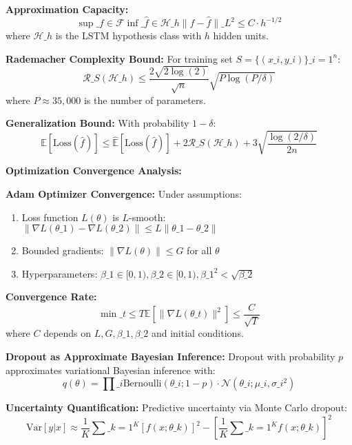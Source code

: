 \documentclass[11pt,a4paper]{article}
\begin{document}
\textbf{Approximation Capacity:}
\begin{equation}
\sup\_{f \in \mathcal{F}} \inf\_{\hat{f} \in \mathcal{H}\_h} \|f - \hat{f}\|\_{L^2} \leq C \cdot h^{-1/2}
\end{equation}
where $\mathcal{H}\_h$ is the LSTM hypothesis class with $h$ hidden units.

\textbf{Rademacher Complexity Bound:}
For training set $S = \{(x\_i, y\_i)\}\_{i=1}^n$:
\begin{equation}
\mathcal{R}\_S(\mathcal{H}\_h) \leq \frac{2\sqrt{2\log(2)}}{\sqrt{n}} \sqrt{P \log(P/\delta)}
\end{equation}
where $P \approx 35,000$ is the number of parameters.

\textbf{Generalization Bound:}
With probability $1-\delta$:
\begin{equation}
\mathbb{E}[\text{Loss}(\hat{f})] \leq \hat{\mathbb{E}}[\text{Loss}(\hat{f})] + 2\mathcal{R}\_S(\mathcal{H}\_h) + 3\sqrt{\frac{\log(2/\delta)}{2n}}
\end{equation}

\textbf{Optimization Convergence Analysis:}

\textbf{Adam Optimizer Convergence:}
Under assumptions:
\begin{enumerate}
\item Loss function $L(\theta)$ is $L$-smooth: $\|\nabla L(\theta\_1) - \nabla L(\theta\_2)\| \leq L\|\theta\_1 - \theta\_2\|$
\item Bounded gradients: $\|\nabla L(\theta)\| \leq G$ for all $\theta$
\item Hyperparameters: $\beta\_1 \in [0,1), \beta\_2 \in [0,1), \beta\_1^2 < \sqrt{\beta\_2}$

\end{enumerate}
\textbf{Convergence Rate:}
\begin{equation}
\min\_{t \leq T} \mathbb{E}[\|\nabla L(\theta\_t)\|^2] \leq \frac{C}{\sqrt{T}}
\end{equation}
where $C$ depends on $L, G, \beta\_1, \beta\_2$ and initial conditions.

\textbf{Dropout as Approximate Bayesian Inference:}
Dropout with probability $p$ approximates variational Bayesian inference with:
\begin{equation}
q(\theta) = \prod\_{i} \text{Bernoulli}(\theta\_i; 1-p) \cdot \mathcal{N}(\theta\_i; \mu\_i, \sigma\_i^2)
\end{equation}

\textbf{Uncertainty Quantification:}
Predictive uncertainty via Monte Carlo dropout:
\begin{equation}
\text{Var}[y|x] \approx \frac{1}{K} \sum\_{k=1}^K [f(x; \theta\_k)]^2 - \left[\frac{1}{K} \sum\_{k=1}^K f(x; \theta\_k)\right]^2
\end{equation}
\end{document}
